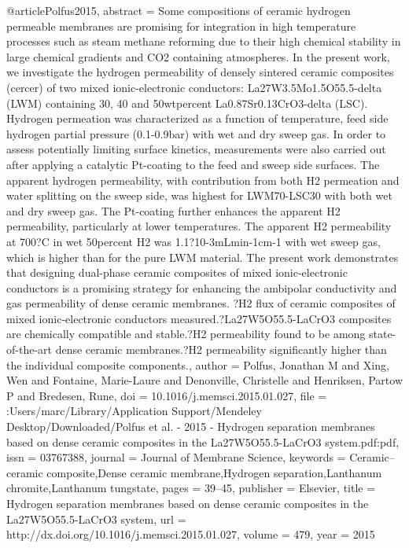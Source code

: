 @article{Polfus2015,
abstract = {Some compositions of ceramic hydrogen permeable membranes are promising for integration in high temperature processes such as steam methane reforming due to their high chemical stability in large chemical gradients and CO2 containing atmospheres. In the present work, we investigate the hydrogen permeability of densely sintered ceramic composites (cercer) of two mixed ionic-electronic conductors: La27W3.5Mo1.5O55.5-delta (LWM) containing 30, 40 and 50wtpercent La0.87Sr0.13CrO3-delta (LSC). Hydrogen permeation was characterized as a function of temperature, feed side hydrogen partial pressure (0.1-0.9bar) with wet and dry sweep gas. In order to assess potentially limiting surface kinetics, measurements were also carried out after applying a catalytic Pt-coating to the feed and sweep side surfaces. The apparent hydrogen permeability, with contribution from both H2 permeation and water splitting on the sweep side, was highest for LWM70-LSC30 with both wet and dry sweep gas. The Pt-coating further enhances the apparent H2 permeability, particularly at lower temperatures. The apparent H2 permeability at 700?C in wet 50percent H2 was 1.1?10-3mLmin-1cm-1 with wet sweep gas, which is higher than for the pure LWM material. The present work demonstrates that designing dual-phase ceramic composites of mixed ionic-electronic conductors is a promising strategy for enhancing the ambipolar conductivity and gas permeability of dense ceramic membranes. ?H2 flux of ceramic composites of mixed ionic-electronic conductors measured.?La27W5O55.5-LaCrO3 composites are chemically compatible and stable.?H2 permeability found to be among state-of-the-art dense ceramic membranes.?H2 permeability significantly higher than the individual composite components.},
author = {Polfus, Jonathan M and Xing, Wen and Fontaine, Marie-Laure and Denonville, Christelle and Henriksen, Partow P and Bredesen, Rune},
doi = {10.1016/j.memsci.2015.01.027},
file = {:Users/marc/Library/Application Support/Mendeley Desktop/Downloaded/Polfus et al. - 2015 - Hydrogen separation membranes based on dense ceramic composites in the La27W5O55.5-LaCrO3 system.pdf:pdf},
issn = {03767388},
journal = {Journal of Membrane Science},
keywords = {Ceramic–ceramic composite,Dense ceramic membrane,Hydrogen separation,Lanthanum chromite,Lanthanum tungstate},
pages = {39--45},
publisher = {Elsevier},
title = {{Hydrogen separation membranes based on dense ceramic composites in the La27W5O55.5-LaCrO3 system}},
url = {http://dx.doi.org/10.1016/j.memsci.2015.01.027},
volume = {479},
year = {2015}
}
